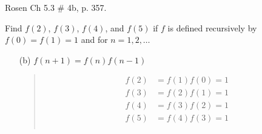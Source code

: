 \documentclass[11pt]{exam}
\begin{document}
\begin{questions}
\question Rosen Ch 5.3 \# 4b, p. 357.
\begin{solution}
Find $f(2)$, $f(3)$, $f(4)$, and $f(5)$ if $f$ is defined
recursively by $f(0) = f(1) = 1$ and for $n=1,2,\ldots$
\begin{itemize}
    \item[(b)] $f(n+1) = f(n)f(n-1)$
    \begin{quote}
    \begin{align*}
        f(2) &= f(1)f(0) = 1 \\
        f(3) &= f(2)f(1) = 1 \\
        f(4) &= f(3)f(2) = 1 \\
        f(5) &= f(4)f(3) = 1 \\
    \end{align*}
    \end{quote}
\end{itemize}
\end{solution}


\end{questions}
\end{document}
